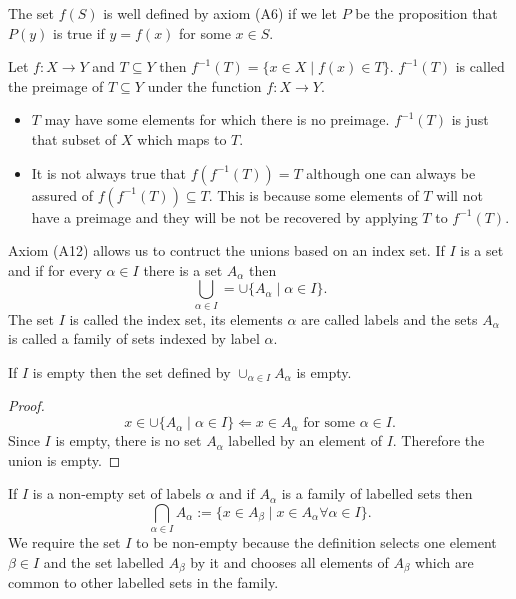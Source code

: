 The set $f(S)$ is well defined by axiom (A6) if we let $P$ be the 
proposition that $P(y)$ is true if $y = f(x)$ for some $x \in S$.

\begin{defn}\label{c2s4d2}
Let $f: X \rightarrow Y$ and $T \subseteq Y$ then $f^{-1}(T) = \{x \in X
\;|\; f(x) \in T\}$. $f^{-1}(T)$ is called the preimage of $T \subseteq
Y$ under the function $f: X \rightarrow Y$.
\end{defn}
\begin{itemize}
\item $T$ may have some elements for which there is no preimage. 
$f^{-1}(T)$ is just that subset of $X$ which maps to $T$.
\item It is not always true that $f(f^{-1}(T)) = T$ although one can always
be assured of $f(f^{-1}(T)) \subseteq T$. This is because some elements of
$T$ will not have a preimage and they will be not be recovered by applying
$T$ to $f^{-1}(T)$.
\end{itemize}

Axiom (A12) allows us to contruct the unions based on an index set. If $I$
is a set and if for every $\alpha \in I$ there is a set $A_\alpha$ then 
\begin{equation}\label{c2s4e1}
\bigcup_{\alpha \in I} = \cup \{A_\alpha \;|\; \alpha \in I\}.
\end{equation}
The set $I$ is called the index set, its elements $\alpha$ are called 
labels and the sets $A_\alpha$ is called a family of sets indexed by label
$\alpha$.

\begin{lem}\label{c2s4l1}
If $I$ is empty then the set defined by $\cup_{\alpha \in I}A_\alpha$ is 
empty.
\end{lem}
\begin{proof}
\[
x \in \cup \{A_\alpha \;|\; \alpha \in I\} \Leftarrow x \in A_\alpha
\text{ for some } \alpha \in I.
\]
Since $I$ is empty, there is no set $A_\alpha$ labelled by an element of 
$I$. Therefore the union is empty.
\end{proof}

If $I$ is a non-empty set of labels $\alpha$ and if $A_\alpha$ is a family
of labelled sets then
\begin{equation}\label{c2s4e2}
\bigcap_{\alpha \in I} A_\alpha := \{x \in A_\beta \;|\; x \in A_\alpha
\forall \alpha \in I\}.
\end{equation}
We require the set $I$ to be non-empty because the definition selects one
element $\beta \in I$ and the set labelled $A_\beta$ by it and chooses
all elements of $A_\beta$ which are common to other labelled sets in the 
family.

